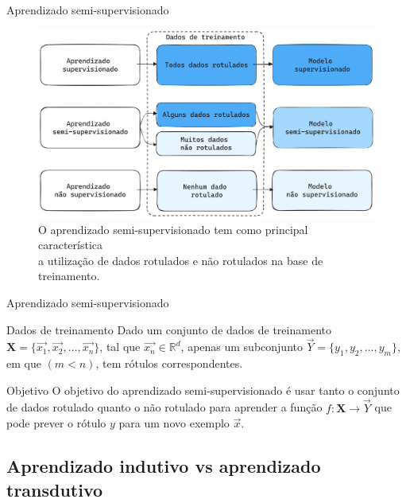 \documentclass{templatebeamerufc/libs/ufc_format}
\begin{document}
\begin{frame}{Aprendizado semi-supervisionado}
  \begin{figure}\label{fig:ilustracao-aprendizado-semi-supervisionado}
    \centering
    \caption{
      O aprendizado semi-supervisionado tem como principal
característica \\ a utilização de dados rotulados e não rotulados na base
de treinamento.
}
    \includegraphics[scale=0.1]{figuras/ilustracao-aprendizado-semi-supervisionado}
    \source{\fonteautor}
  \end{figure}
\end{frame}


\begin{frame}{Aprendizado semi-supervisionado}
  \begin{block}{Dados de treinamento}
    Dado um conjunto de dados de treinamento $ \mathbf{X} =
    \{\vec{x_1}, \vec{x_2}, \ldots, \vec{x_n}\} $, tal que $ \vec{x_n} \in \mathbb{R}^d $,
    apenas um subconjunto $ \vec{Y} = \{y_1, y_2, \ldots , y_m\} $,
    em que $ (m < n) $, tem rótulos correspondentes.
  \end{block}

  \pause{}

  \begin{block}{Objetivo}
    O objetivo do aprendizado semi-supervisionado é usar tanto o
conjunto de dados rotulado quanto o não rotulado para aprender a
função $ f: \mathbf{X} \rightarrow \vec{Y} $ que pode prever o rótulo $ y $ para
um novo exemplo $ \vec{x} $.
  \end{block}
\end{frame}


\subsection{Aprendizado indutivo vs aprendizado transdutivo}
\end{document}
